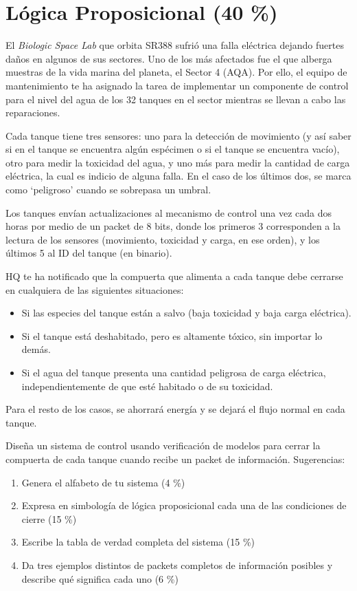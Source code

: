 \documentclass{article}
\begin{document}
\section{Lógica Proposicional (40 \%)}

El \textit{Biologic Space Lab} que orbita \textsc{SR388} sufrió una falla eléctrica dejando fuertes daños en algunos de sus sectores. Uno de los más afectados fue el que alberga muestras de la vida marina del planeta, el Sector 4 (AQA). Por ello, el equipo de mantenimiento te ha asignado la tarea de implementar un componente de control para el nivel del agua de los 32 tanques en el sector mientras se llevan a cabo las reparaciones.

Cada tanque tiene tres sensores: uno para la detección de movimiento (y así saber si en el tanque se encuentra algún espécimen o si el tanque se encuentra vacío), otro para medir la toxicidad del agua, y uno más para medir la cantidad de carga eléctrica, la cual es indicio de alguna falla. En el caso de los últimos dos, se marca como `peligroso' cuando se sobrepasa un umbral.

Los tanques envían actualizaciones al mecanismo de control una vez cada dos horas por medio de un packet de 8 bits, donde los primeros 3 corresponden a la lectura de los sensores (movimiento, toxicidad y carga, en ese orden), y los últimos 5 al ID del tanque (en binario).

HQ te ha notificado que la compuerta que alimenta a cada tanque debe cerrarse en cualquiera de las siguientes situaciones:

\begin{itemize}
    \itemsep0em
    \item Si las especies del tanque están a salvo (baja toxicidad y baja carga eléctrica).
    \item Si el tanque está deshabitado, pero es altamente tóxico, sin importar lo demás.
    \item Si el agua del tanque presenta una cantidad peligrosa de carga eléctrica, independientemente de que esté habitado o de su toxicidad.
\end{itemize}

Para el resto de los casos, se ahorrará energía y se dejará el flujo normal en cada tanque.

Diseña un sistema de control usando verificación de modelos para cerrar la compuerta de cada tanque cuando recibe un packet de información.
Sugerencias:

\begin{enumerate}[label=\tt \alph*)]
    \item Genera el alfabeto de tu sistema (4 \%)
    \item Expresa en simbología de lógica proposicional cada una de las condiciones de cierre (15 \%)
    \item Escribe la tabla de verdad completa del sistema (15 \%)
    \item Da tres ejemplos distintos de packets completos de información posibles y describe qué significa cada uno (6 \%)
\end{enumerate}
\end{document}
